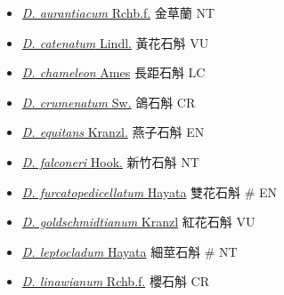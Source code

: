\begin{itemize}
  \begin{itemize}
        \item[] \href{http://www.theplantlist.org/tpl1.1/search?q=Dendrobium+aurantiacum}{\textit{D. aurantiacum} Rchb.f.}   金草蘭   NT
        \item[] \href{http://www.theplantlist.org/tpl1.1/search?q=Dendrobium+catenatum}{\textit{D. catenatum} Lindl.}   黃花石斛   VU
        \item[] \href{http://www.theplantlist.org/tpl1.1/search?q=Dendrobium+chameleon}{\textit{D. chameleon} Ames}   長距石斛   LC
        \item[] \href{http://www.theplantlist.org/tpl1.1/search?q=Dendrobium+crumenatum}{\textit{D. crumenatum} Sw.}   鴿石斛   CR
        \item[] \href{http://www.theplantlist.org/tpl1.1/search?q=Dendrobium+equitans}{\textit{D. equitans} Kranzl.}   燕子石斛   EN
        \item[] \href{http://www.theplantlist.org/tpl1.1/search?q=Dendrobium+falconeri}{\textit{D. falconeri} Hook.}   新竹石斛   NT
        \item[] \href{http://www.theplantlist.org/tpl1.1/search?q=Dendrobium+furcatopedicellatum}{\textit{D. furcatopedicellatum} Hayata}   雙花石斛  \# EN
        \item[] \href{http://www.theplantlist.org/tpl1.1/search?q=Dendrobium+goldschmidtianum}{\textit{D. goldschmidtianum} Kranzl}   紅花石斛   VU
        \item[] \href{http://www.theplantlist.org/tpl1.1/search?q=Dendrobium+leptocladum}{\textit{D. leptocladum} Hayata}   細莖石斛  \# NT
        \item[] \href{http://www.theplantlist.org/tpl1.1/search?q=Dendrobium+linawianum}{\textit{D. linawianum} Rchb.f.}   櫻石斛   CR

\end{itemize}
\end{itemize}
